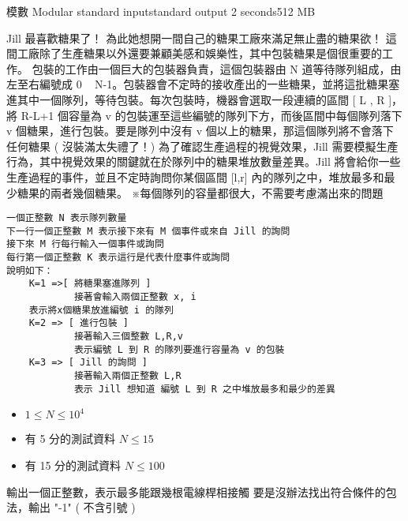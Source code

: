 \gdef\thisproblemauthor{}
\gdef\thisproblemdeveloper{}
\gdef\thisproblemorigin{}
\begin{problem}{模數 Modular}
{standard input}{standard output}
{2 seconds}{512 MB}{}

Jill 最喜歡糖果了！\newline
為此她想開一間自己的糖果工廠來滿足無止盡的糖果欲！\newline
\newline
這間工廠除了生產糖果以外還要兼顧美感和娛樂性，其中包裝糖果是個很重要的工作。\newline
包裝的工作由一個巨大的包裝器負責，這個包裝器由 N 道等待隊列組成，由左至右編號成 0 ~ N-1。包裝器會不定時的接收產出的一些糖果，並將這批糖果塞進其中一個隊列，等待包裝。每次包裝時，機器會選取一段連續的區間 [ L , R ]，將 R-L+1 個容量為 v 的包裝運至這些編號的隊列下方，而後區間中每個隊列落下 v 個糖果，進行包裝。要是隊列中沒有 v 個以上的糖果，那這個隊列將不會落下任何糖果 ( 沒裝滿太失禮了！)\newline
\newline
為了確認生產過程的視覺效果，Jill 需要模擬生產行為，其中視覺效果的關鍵就在於隊列中的糖果堆放數量差異。Jill 將會給你一些生產過程的事件，並且不定時詢問你某個區間 [l,r] 內的隊列之中，堆放最多和最少糖果的兩者幾個糖果。\newline
\newline
※每個隊列的容量都很大，不需要考慮滿出來的問題\newline


\InputFile

\begin{verbatim}
一個正整數 N 表示隊列數量
下一行一個正整數 M 表示接下來有 M 個事件或來自 Jill 的詢問
接下來 M 行每行輸入一個事件或詢問
每行第一個正整數 K 表示這行是代表什麼事件或詢問
說明如下：
    K=1 =>[ 將糖果塞進隊列 ]
            接著會輸入兩個正整數 x, i
    表示將x個糖果放進編號 i 的隊列
    K=2 => [ 進行包裝 ]
            接著輸入三個整數 L,R,v
            表示編號 L 到 R 的隊列要進行容量為 v 的包裝
    K=3 => [ Jill 的詢問 ]
            接著輸入兩個正整數 L,R
            表示 Jill 想知道 編號 L 到 R 之中堆放最多和最少的差異
\end{verbatim}


\begin{iofmt}
\begin{itemize}
	\item $1 \leq N \leq 10^4$
	\item 有 5 分的測試資料 $N \leq 15$
	\item 有 15 分的測試資料 $N \leq 100$
\end{itemize}
\end{iofmt}

\OutputFile

輸出一個正整數，表示最多能跟幾根電線桿相接觸\newline
要是沒辦法找出符合條件的包法，輸出 "-1" ( 不含引號 )\newline

\Examples

\begin{example}
\end{example}

\end{problem}
